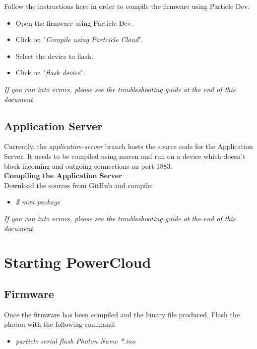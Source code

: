 \documentclass[a4paper,10pt]{article}
\begin{document}
	Follow the instructions here in order to compile the firmware using Particle 
	Dev.
	\\
	\begin{itemize}
		\item Open the firmware using Particle Dev.
		\item Click on "\textit{Compile using Partcicle Cloud}".
		\item Select the device to flash.
		\item Click on "\textit{flash device}".
	\end{itemize}
	
	\textit{If you run into errors, please see the troubleshooting guide at the end of this document.}
	
	\subsection{Application Server}
	Currently, the \textit{application-server} branch hosts the source code for 
	the Application Server. It needs to be compiled using maven and run on a 
	device which doesn't block incoming and outgoing connections on port 1883.\\
	
	\textbf{Compiling the Application Server}\\
	Download the sources from GitHub and compile:\\
	
	\begin{itemize}
		\item \textit{\$ mvn package}
	\end{itemize}		
	
	\textit{If you run into errors, please see the troubleshooting guide at the end of this document.}
	
	\newpage
	\section{Starting PowerCloud}
	\subsection{Firmware}
	Once the firmware has been compiled and the binary file produced. Flash the photon with the following command:
	
	\begin{itemize}
		\item \textit{particle serial flash Photon Name *.ino}
	\end{itemize}
	
\end{document}
